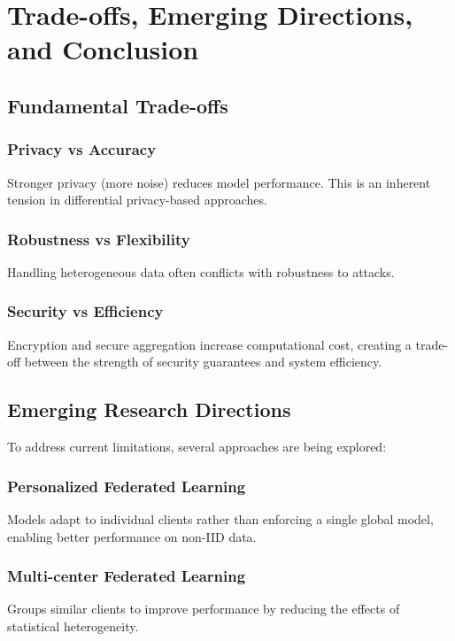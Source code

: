 
\chapter{Trade-offs, Emerging Directions, and Conclusion}
\label{ch:chapter5}

\section{Fundamental Trade-offs}

\subsection{Privacy vs Accuracy}

Stronger privacy (more noise) reduces model performance. This is an inherent tension in differential privacy-based approaches.

\subsection{Robustness vs Flexibility}

Handling heterogeneous data often conflicts with robustness to attacks.

\subsection{Security vs Efficiency}

Encryption and secure aggregation increase computational cost, creating a trade-off between the strength of security guarantees and system efficiency.

\section{Emerging Research Directions}

To address current limitations, several approaches are being explored:

\subsection{Personalized Federated Learning}
Models adapt to individual clients rather than enforcing a single global model, enabling better performance on non-IID data.

\subsection{Multi-center Federated Learning}
Groups similar clients to improve performance by reducing the effects of statistical heterogeneity.

